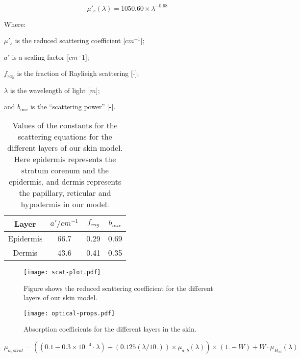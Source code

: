 \begin{equation}
\mu'_s(\lambda)=1050.60\times\lambda^{-0.68}
\label{eqn:hyposcat}
\end{equation}


\noindent Where:

	$\mu'_s$ is the reduced scattering coefficient [$cm^{-1}$];

	$a'$ is a scaling factor [$cm^-1$];

	$f_{ray}$ is the fraction of Raylieigh scattering [-];

	$\lambda$ is the wavelength of light [$m$];

	and $b_{\text{mie}}$ is the ``scattering power'' [-].

\begin{table}[!htpb]
  \centering

  \begin{tabular}{|c|c|c|c|}
  \hline

  Layer & $a'/cm^{-1}$ & $f_{ray}$ & $b_{mie}$ \\
  \hline
   Epidermis         & 66.7 & 0.29 & 0.69 \\
   Dermis  & 43.6 & 0.41 & 0.35 \\

  \hline
  \end{tabular}
  \caption{Values of the constants for the scattering equations for the different layers of our skin model. Here epidermis represents the stratum corenum and the epidermis, and dermis represents the papillary, reticular and hypodermis in our model.}
  \label{tab:valscat}

\end{table}

\begin{figure}[!htpb]
	\centering
	\texttt{[image: scat-plot.pdf]}
	\caption{Figure shows the reduced scattering coefficient for the different layers of our skin model.}
	\label{fig:scatplot}
\end{figure}



\begin{figure}[!htpb]
  \centering
  \texttt{[image: optical-props.pdf]}
  \caption{Absorption coefficients for the different layers in the skin.}
  \label{fig:absoplayers}
\end{figure}


\begin{equation}
\mu_{a,strat}= ((0.1 - 0.3\times10^{-4}\cdot\lambda) + (0.125(\lambda/10.))\times \mu_{a,b}(\lambda))\times(1. - W) + W\cdot\mu_{H_20}(\lambda)
\end{equation}

